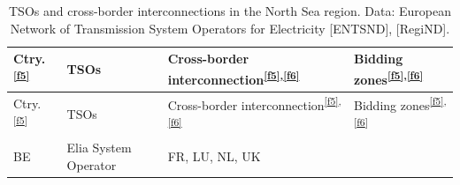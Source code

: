 \begin{longtable}[]{@{}llll@{}}
\caption{TSOs and cross-border interconnections in the North Sea region.
Data: European Network of Transmission System Operators for Electricity
{[}ENTSND{]}, {[}RegiND{]}.}\tabularnewline
\toprule
\begin{minipage}[b]{0.07\columnwidth}\raggedright
Ctry.\textsuperscript{\protect\hyperlink{f5}{{[}f5{]}}}\strut
\end{minipage} & \begin{minipage}[b]{0.36\columnwidth}\raggedright
TSOs\strut
\end{minipage} & \begin{minipage}[b]{0.22\columnwidth}\raggedright
Cross-border
interconnection\textsuperscript{\protect\hyperlink{f5}{{[}f5{]}},\protect\hyperlink{f6}{{[}f6{]}}}\strut
\end{minipage} & \begin{minipage}[b]{0.22\columnwidth}\raggedright
Bidding
zones\textsuperscript{\protect\hyperlink{f5}{{[}f5{]}},\protect\hyperlink{f6}{{[}f6{]}}}\strut
\end{minipage}\tabularnewline
\midrule
\endfirsthead
\toprule
\begin{minipage}[b]{0.07\columnwidth}\raggedright
Ctry.\textsuperscript{\protect\hyperlink{f5}{{[}f5{]}}}\strut
\end{minipage} & \begin{minipage}[b]{0.36\columnwidth}\raggedright
TSOs\strut
\end{minipage} & \begin{minipage}[b]{0.22\columnwidth}\raggedright
Cross-border
interconnection\textsuperscript{\protect\hyperlink{f5}{{[}f5{]}},\protect\hyperlink{f6}{{[}f6{]}}}\strut
\end{minipage} & \begin{minipage}[b]{0.22\columnwidth}\raggedright
Bidding
zones\textsuperscript{\protect\hyperlink{f5}{{[}f5{]}},\protect\hyperlink{f6}{{[}f6{]}}}\strut
\end{minipage}\tabularnewline
\midrule
\endhead
\begin{minipage}[t]{0.07\columnwidth}\raggedright
BE\strut
\end{minipage} & \begin{minipage}[t]{0.36\columnwidth}\raggedright
Elia System Operator\strut
\end{minipage} & \begin{minipage}[t]{0.22\columnwidth}\raggedright
FR, LU, NL, UK\strut
\end{minipage} & \begin{minipage}[t]{0.22\columnwidth}\raggedright

\end{minipage}
\end{longtable}
